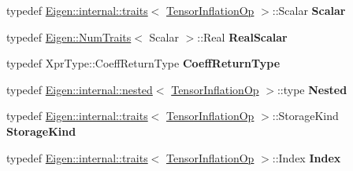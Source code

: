 \begin{DoxyCompactItemize}
typedef \hyperlink{struct_eigen_1_1internal_1_1traits}{Eigen\+::internal\+::traits}$<$ \hyperlink{class_eigen_1_1_tensor_inflation_op}{Tensor\+Inflation\+Op} $>$\+::Scalar {\bfseries Scalar}
\item 
\mbox{\label{class_eigen_1_1_tensor_inflation_op_a328f34b1ae6629d1ceff82b08b538144}} 
typedef \hyperlink{group___core___module_struct_eigen_1_1_num_traits}{Eigen\+::\+Num\+Traits}$<$ Scalar $>$\+::Real {\bfseries Real\+Scalar}
\item 
\mbox{\label{class_eigen_1_1_tensor_inflation_op_a434347894bf1e84b4932cf62b205c185}} 
typedef Xpr\+Type\+::\+Coeff\+Return\+Type {\bfseries Coeff\+Return\+Type}
\item 
\mbox{\label{class_eigen_1_1_tensor_inflation_op_a8d5118ec09afae8fd420cbebd370b281}} 
typedef \hyperlink{struct_eigen_1_1internal_1_1nested}{Eigen\+::internal\+::nested}$<$ \hyperlink{class_eigen_1_1_tensor_inflation_op}{Tensor\+Inflation\+Op} $>$\+::type {\bfseries Nested}
\item 
\mbox{\label{class_eigen_1_1_tensor_inflation_op_ae9a66f9458b7bb430952017d88c46bba}} 
typedef \hyperlink{struct_eigen_1_1internal_1_1traits}{Eigen\+::internal\+::traits}$<$ \hyperlink{class_eigen_1_1_tensor_inflation_op}{Tensor\+Inflation\+Op} $>$\+::Storage\+Kind {\bfseries Storage\+Kind}
\item 
\mbox{\label{class_eigen_1_1_tensor_inflation_op_afe1a7224db27007325cbee73f0287d2a}} 
typedef \hyperlink{struct_eigen_1_1internal_1_1traits}{Eigen\+::internal\+::traits}$<$ \hyperlink{class_eigen_1_1_tensor_inflation_op}{Tensor\+Inflation\+Op} $>$\+::Index {\bfseries Index}
\end{DoxyCompactItemize}
